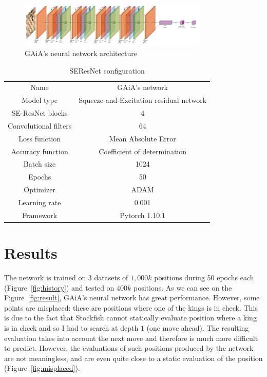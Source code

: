 \documentclass[unnumsec,webpdf,contemporary,large]{Article}%
\theoremstyle{thmstyleone}%
\theoremstyle{thmstyletwo}%
\theoremstyle{thmstylethree}%
\begin{document}
\begin{figure}[H]
  \centering
  \includegraphics[width=9cm]{network/network.pdf}
  \caption{GAiA's neural network architecture}
  \label{fig:model_archi}
\end{figure}

\begin{table}[H]
  \centering
  \begin{tabular}{c c}
    \hline
    Name & GAiA's network\\
    Model type & Squeeze-and-Excitation residual network\\
    \hline
    SE-ResNet blocks & 4\\
    Convolutional filters & 64\\
    Loss function & Mean Absolute Error\\
    Accuracy function & Coefficient of determination\\
    Batch size & 1024\\
    Epochs & 50\\
    Optimizer & ADAM\\
    Learning rate & 0.001\\
    Framework & Pytorch 1.10.1\\
    \hline
  \end{tabular}
  \caption{SEResNet configuration}
  \label{table:config}
\end{table}

\section{Results}

The network is trained on 3 datasets of $1,000k$ positions during 50 epochs each
(Figure~\ref{fig:history}) and tested on $400k$ positions.
As we can see on the Figure~\ref{fig:result}, GAiA's neural network
has great performance.
However, some points are misplaced: these are positions where one of the kings is
in check. This is due to the fact that Stockfish cannot statically evaluate
position where a king is in check and so I had to search at depth $1$ (one move ahead).
The resulting evaluation takes into account the next move and therefore
is much more difficult to predict. However, the evaluations of
such positions produced by the network are not meaningless,
and are even quite close to a static evaluation of the position
(Figure~\ref{fig:misplaced}).
\end{document}
